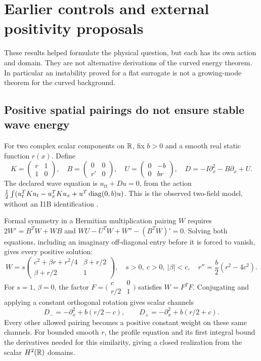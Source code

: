 \section{Earlier controls and external positivity proposals}
\label{sec:controls}

These results helped formulate the physical question, but each has its own
action and domain. They are not alternative derivations of the curved
energy theorem. In particular an instability proved for a flat surrogate
is not a growing-mode theorem for the curved background.

\subsection{Positive spatial pairings do not ensure stable wave energy}
For two complex scalar components on $\mathbb R$, fix $b>0$ and a smooth real
static function $r(x)$. Define
\begin{equation}
 K=\begin{pmatrix}r&1\\1&0\end{pmatrix},\quad
 B=\begin{pmatrix}0&0\\r'&0\end{pmatrix},\quad
 U=\begin{pmatrix}0&-b\\0&br\end{pmatrix},\quad
 D=-I\partial_x^2-B\partial_x+U.
 \label{eq:twowave}
\end{equation}
The declared wave equation is $u_{tt}+Du=0$, from the action
$\frac12\int(u_t^TKu_t-u_x^TKu_x+u^T\operatorname{diag}(0,b)u)$.
This is the observed two-field model, without an I1B identification
\cite{StaticPairing}.

Formal symmetry in a Hermitian multiplication pairing $W$ requires
$2W'=B^TW+WB$ and $WU-U^TW+W''-(B^TW)'=0$.
Solving both equations, including an imaginary off-diagonal entry before
it is forced to vanish, gives every positive solution:
\begin{equation}
 W=s\begin{pmatrix}
 c^2+\beta r+r^2/4&\beta+r/2\\\beta+r/2&1
 \end{pmatrix},\quad
 s>0,\ c>0,\ |\beta|<c,\quad
 r''=\frac b2(r^2-4c^2).\label{eq:pairingclass}
\end{equation}
For $s=1$, $\beta=0$, the factor
$F=\bigl(\begin{smallmatrix}c&0\\r/2&1\end{smallmatrix}\bigr)$
satisfies $W=F^TF$. Conjugating and applying a constant orthogonal
rotation gives scalar channels
\begin{equation}
 D_-=-\partial_x^2+b(r/2-c),\qquad
 D_+=-\partial_x^2+b(r/2+c).\label{eq:scalar-channels}
\end{equation}
Every other allowed pairing becomes a positive constant weight on these
same channels. For bounded smooth $r$, the profile equation and its first
integral bound the derivatives needed for this similarity, giving a
closed realization from the scalar $H^2(\mathbb R)$ domains.

